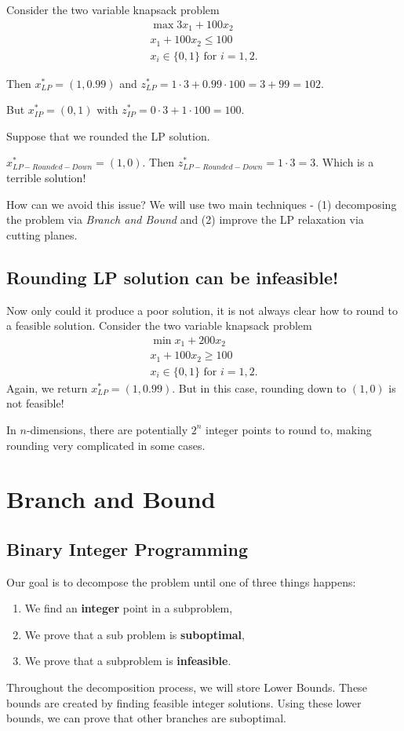   Consider the two variable knapsack problem
  \begin{align}
  \max   3x_1 + 100 x_2\\
              x_1  + 100 x_2 \leq 100\\
              x_i \in \{0,1\} \text{ for } i=1,2.
  \end{align}
  
  Then $x^*_{LP} = (1, 0.99)$ and $z^*_{LP} = 1\cdot 3 + 0.99\cdot 100 = 3 + 99 = 102.$
  
  But $x^*_{IP} = (0,1)$ with $z^*_{IP} = 0\cdot 3 + 1 \cdot 100 = 100$.
  
  Suppose that we rounded the LP solution.  
  
  $x^*_{LP-Rounded-Down} = (1,0)$.  Then $z^*_{LP-Rounded-Down} = 1\cdot 3 = 3$.  Which is a terrible solution!
  
  
  How can we avoid this issue?  We will use two main techniques - (1) decomposing the problem via \emph{Branch and Bound} and (2) improve the LP relaxation via cutting planes.
    
  \subsection{Rounding LP solution can be infeasible!}
  Now only could it produce a poor solution, it is not always clear how to round to a feasible solution.  
    Consider the two variable knapsack problem
  \begin{align}
  \min   x_1 + 200 x_2\\
              x_1  + 100 x_2 \geq 100\\
              x_i \in \{0,1\} \text{ for } i=1,2.
  \end{align}
  Again, we return  $x^*_{LP} = (1, 0.99)$.  But in this case, rounding down to $(1,0)$ is not feasible!
  
  In $n$-dimensions, there are potentially $2^n$ integer points to round to, making rounding very complicated in some cases.
 



\section{Branch and Bound}
\subsection{Binary Integer Programming}
Our goal is to decompose the problem until one of three things happens:
\begin{enumerate}
\item We find an \textbf{integer} point in a subproblem,
\item We prove that a sub problem is \textbf{suboptimal},
\item We prove that a subproblem is \textbf{infeasible}.
\end{enumerate}
Throughout the decomposition process, we will store Lower Bounds.  These bounds are created by finding feasible integer solutions.  Using these lower bounds, we can prove that other branches are suboptimal.


